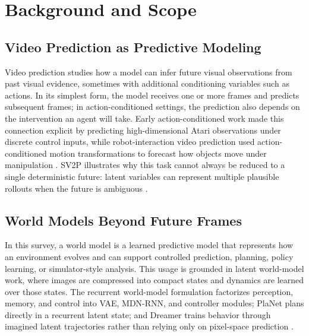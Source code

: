 \section{Background and Scope}

\subsection{Video Prediction as Predictive Modeling}

Video prediction studies how a model can infer future visual observations from past visual evidence, sometimes with additional conditioning variables such as actions. In its simplest form, the model receives one or more frames and predicts subsequent frames; in action-conditioned settings, the prediction also depends on the intervention an agent will take. Early action-conditioned work made this connection explicit by predicting high-dimensional Atari observations under discrete control inputs, while robot-interaction video prediction used action-conditioned motion transformations to forecast how objects move under manipulation \cite{oh2015_action_conditional_video_prediction_prov,finn2016_physical_interaction_video_prediction_prov}. SV2P illustrates why this task cannot always be reduced to a single deterministic future: latent variables can represent multiple plausible rollouts when the future is ambiguous \cite{babaeizadeh2018_sv2p_prov}.

\subsection{World Models Beyond Future Frames}

In this survey, a world model is a learned predictive model that represents how an environment evolves and can support controlled prediction, planning, policy learning, or simulator-style analysis. This usage is grounded in latent world-model work, where images are compressed into compact states and dynamics are learned over those states. The recurrent world-model formulation factorizes perception, memory, and control into VAE, MDN-RNN, and controller modules; PlaNet plans directly in a recurrent latent state; and Dreamer trains behavior through imagined latent trajectories rather than relying only on pixel-space prediction \cite{ha2018_world_models_prov,hafner2019_planet_prov,hafner2020_dreamer_prov}.

